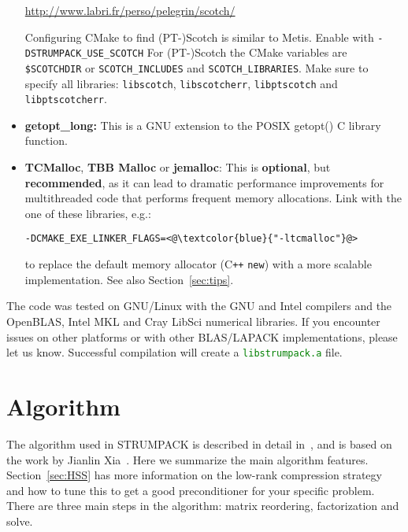 \documentclass{article}
\newcommand{\tm}{\textsuperscript{\textregistered}}
\begin{document}
\begin{itemize}
  \url{http://www.labri.fr/perso/pelegrin/scotch/}

  Configuring CMake to find (PT-)Scotch is similar to Metis. Enable
  with \lstinline[style=Bash]!-DSTRUMPACK_USE_SCOTCH! For (PT-)Scotch
  the CMake variables are
  \lstinline[style=Bash]!$SCOTCHDIR! or
  \lstinline[style=Bash]!SCOTCH_INCLUDES! and
  \lstinline[style=Bash]!SCOTCH_LIBRARIES!. Make sure to specify all
  libraries: \lstinline[style=Bash]!libscotch!,
  \lstinline[style=Bash]!libscotcherr!,
  \lstinline[style=Bash]!libptscotch! and
  \lstinline[style=Bash]!libptscotcherr!.

\item \textbf{getopt\_long:} This is a GNU extension to the POSIX
  getopt() C library function.
\item \textbf{TCMalloc}, \textbf{TBB Malloc} or \textbf{jemalloc}:
  This is \textbf{optional}, but \textbf{recommended}, as it can lead
  to dramatic performance improvements for multithreaded code that
  performs frequent memory allocations. Link with the one of these
  libraries, e.g.:
  \begin{lstlisting}[style=Bash]
  -DCMAKE_EXE_LINKER_FLAGS=<@\textcolor{blue}{"-ltcmalloc"}@>
  \end{lstlisting}
  to replace the default memory allocator (C\texttt{++} \texttt{new})
  with a more scalable implementation. See also
  Section~\ref{sec:tips}.
\end{itemize}
The code was tested on GNU/Linux with the GNU and Intel\tm{} compilers
and the OpenBLAS, Intel\tm{} MKL\tm{} and Cray\tm{} LibSci\tm{}
numerical libraries. If you encounter issues on other platforms or
with other BLAS/LAPACK implementations, please let us know.
Successful compilation will create a
\textcolor{green}{\texttt{libstrumpack.a}} file.


\section{Algorithm}\label{sec:algo}
The algorithm used in STRUMPACK is described in detail
in~\cite{ghysels2015sparse}, and is based on the work by Jianlin
Xia~\cite{xia2013randomized}. Here we summarize the main algorithm
features. Section~\ref{sec:HSS} has more information on the low-rank
compression strategy and how to tune this to get a good preconditioner
for your specific problem. There are three main steps in the
algorithm: matrix reordering, factorization and solve.
\end{document}
